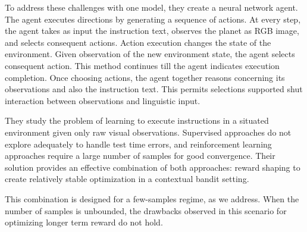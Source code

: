 To address these challenges with one model, they create a neural network agent. The agent executes directions by generating a sequence of actions. At every step, the agent takes as input the instruction text, observes the planet as RGB image, and selects consequent actions. Action execution changes the state of the environment. Given observation of the new environment state, the agent selects consequent action. This method continues till the agent indicates execution completion. Once choosing actions, the agent together reasons concerning its observations and also the instruction text. This permits selections supported shut interaction between observations and linguistic input.

They study the problem of learning to execute instructions in a situated environment given only raw visual observations. Supervised approaches do not explore adequately to handle test time errors, and reinforcement learning approaches require a large number of samples for good convergence. Their solution provides an effective combination of both approaches: reward shaping to create relatively stable optimization in a contextual bandit setting.

This combination is designed for a few-samples regime, as we address. When the number of samples is unbounded, the drawbacks observed in this scenario for optimizing longer term reward do not hold.
